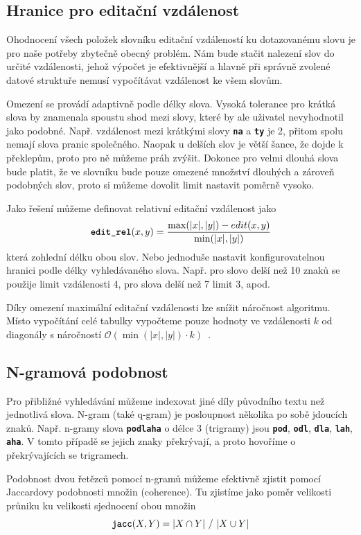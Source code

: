 \documentclass[11pt,letterpaper,oneside,openright]{book}
\newcommand{\bftt}[1]{\texttt{\textbf{#1}}}
\begin{document}
\subsection{Hranice pro editační vzdálenost}
Ohodnocení všech položek slovníku editační vzdáleností ku dotazovanému slovu je
pro naše potřeby zbytečně obecný problém. Nám bude stačit nalezení slov do
určité vzdálenosti, jehož výpočet je efektivnější a hlavně při správně zvolené
datové struktuře nemusí vypočítávat vzdálenost ke všem slovům.

Omezení se provádí adaptivně podle délky slova. Vysoká tolerance pro krátká
slova by znamenala spoustu shod mezi slovy, které by ale uživatel nevyhodnotil
jako podobné. Např. vzdálenost mezi krátkými slovy \bftt{na} a \bftt{ty} je 2,
přitom spolu nemají slova pranic společného. Naopak u delších slov je větší
šance, že dojde k překlepům, proto pro ně můžeme práh zvýšit. Dokonce pro velmi
dlouhá slova bude platit, že ve slovníku bude pouze omezené množství dlouhých a
zároveň podobných slov, proto si můžeme dovolit limit nastavit poměrně vysoko.

Jako řešení můžeme definovat relativní editační vzdálenost jako
\[\bftt{edit\_rel}(x, y) = \frac{\max (|x|, |y|) - edit(x, y)}{\min (|x|,
|y|)}\]
která zohlední délku obou slov. Nebo jednoduše nastavit konfigurovatelnou
hranici podle délky vyhledávaného slova. Např. pro slovo delší než 10 znaků se
použije limit vzdálenosti 4, pro slova delší než 7 limit 3, apod.

Díky omezení maximální editační vzdálenosti lze snížit náročnost algoritmu.
Místo vypočítání celé tabulky vypočteme pouze hodnoty ve vzdálenosti $k$ od
diagonály s náročností $\mathcal{O}(\min (|x|, |y|) \cdot
k)$~\cite{Ukkonen:1985:AAS:4620.4626}.


\subsection{N-gramová podobnost}
Pro přibližné vyhledávání můžeme indexovat jiné díly původního textu než
jednotlivá slova. N-gram (také q-gram) je posloupnost několika po sobě jdoucích
znaků. Např. n-gramy slova \bftt{podlaha} o délce 3 (trigramy) jsou \bftt{pod},
\bftt{odl}, \bftt{dla}, \bftt{lah}, \bftt{aha}. V tomto případě se jejich znaky
překrývají, a proto hovoříme o překrývajících se trigramech.

Podobnost dvou řetězců pomocí n-gramů můžeme efektivně zjistit pomocí
Jaccardovy podobnosti množin (coherence). Tu zjistíme jako poměr velikosti
průniku ku velikosti sjednocení obou množin \[\bftt{jacc}(X, Y) = |X \cap Y|\
/\ |X \cup Y|\]
\end{document}
